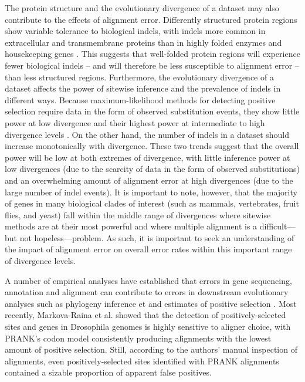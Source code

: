 \documentclass{mbe}
\begin{document}
The protein structure and the evolutionary divergence of a dataset may
also contribute to the effects of alignment error. Differently
structured protein regions show variable tolerance to biological
indels, with indels more common in extracellular and transmembrane
proteins than in highly folded enzymes and housekeeping genes
\citep{delaChaux2007DNA} . This suggests that well-folded protein
regions will experience fewer biological indels -- and will therefore
be less susceptible to alignment error -- than less structured
regions. Furthermore, the evolutionary divergence of a dataset affects
the power of sitewise inference and the prevalence of indels in
different ways. Because maximum-likelihood methods for detecting
positive selection require data in the form of observed substitution
events, they show little power at low divergence and their highest
power at intermediate to high divergence levels
\citep{Anisimova2001Accuracy}. On the other hand, the number of indels
in a dataset should increase monotonically with divergence. These two
trends suggest that the overall power will be low at both extremes of
divergence, with little inference power at low divergences (due to the
scarcity of data in the form of observed substitutions) and an
overwhelming amount of alignment error at high divergences (due to the
large number of indel events). It is important to note, however, that
the majority of genes in many biological clades of interest (such as
mammals, vertebrates, fruit flies, and yeast) fall within the middle
range of divergences where sitewise methods are at their most powerful
and where multiple alignment is a difficult---but not
hopeless---problem. As such, it is important to seek an understanding
of the impact of alignment error on overall error rates within this
important range of divergence levels.

A number of empirical analyses have established that errors in gene
sequencing, annotation and alignment can contribute to errors in
downstream evolutionary analyses such as phylogeny inference
\citep{Wong2008Alignment} et and estimates of positive selection
\citep{Schneider2009Estimates,Markova-Raina2011High} . Most recently,
Markova-Raina et al. \citeyearpar{Markova-Raina2011High} showed that
the detection of positively-selected sites and genes in Drosophila
genomes is highly sensitive to aligner choice, with PRANK's codon
model consistently producing alignments with the lowest amount of
positive selection. Still, according to the authors' manual inspection
of alignments, even positively-selected sites identified with PRANK
alignments contained a sizable proportion of apparent false positives.
\end{document}
